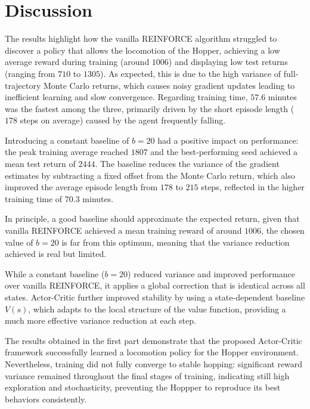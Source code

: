 \section{Discussion}

The results highlight how the vanilla REINFORCE algorithm struggled to 
discover a policy that allows the locomotion of the Hopper, achieving a 
low average reward during training (around $1006$) and displaying low test 
returns (ranging from $710$ to $1305$). As expected, this is due to the high 
variance of full-trajectory Monte Carlo returns, which causes noisy gradient 
updates leading to inefficient learning and slow convergence. Regarding 
training time, $57.6$ minutes was the fastest among the three, primarily 
driven by the short episode length ($178$ steps on average) caused by the 
agent frequently falling.

Introducing a constant baseline of $b{=}20$ had a positive impact on 
performance: the peak training average reached $1807$ and the best-performing 
seed achieved a mean test return of $2444$. The baseline reduces the variance 
of the gradient estimates by subtracting a fixed offset from the Monte Carlo 
return, which also improved the average episode length from $178$ to $215$ 
steps, reflected in the higher training time of $70.3$ minutes. 

In principle, 
a good baseline should approximate the expected return, given that vanilla 
REINFORCE achieved a mean training reward of around $1006$, the chosen value 
of $b{=}20$ is far from this optimum, meaning that the variance reduction 
achieved is real but limited.


While a constant baseline ($b=20$) reduced variance and improved performance over vanilla REINFORCE, it applies a global correction that is identical across all states. Actor-Critic further improved stability by using a state-dependent baseline $V(s)$, which adapts to the local structure of the value function, providing a much more effective variance reduction at each step.



The results obtained in the first part demonstrate that the proposed Actor-Critic framework successfully learned a locomotion policy for the Hopper environment.
Nevertheless, training did not fully converge to stable hopping: significant reward variance remained throughout the final stages of training, 
indicating still high exploration and stochasticity, preventing the Hoppper to reproduce its best behaviors consistently.

